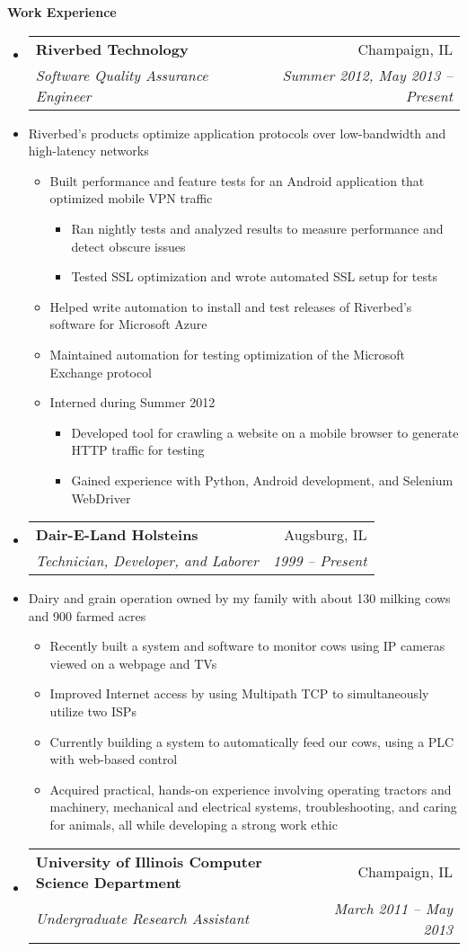 \documentclass[letterpaper,11pt]{article}
\makeatletter
\newcommand{\resitem}[1]{\item #1 \vspace{-2pt}}
\newcommand{\resheading}[1]{{\large \colorbox{mygrey}{\begin{minipage}{\textwidth}{\textbf{#1 \vphantom{p\^{E}}}}\end{minipage}}}}
\newcommand{\ressubheading}[4]{
\begin{tabular*}{7.0in}{l@{\extracolsep{\fill}}r}
		\textbf{#1} & #2 \\
		\textit{#3} & \textit{#4} \\
\end{tabular*}\vspace{-6pt}}
\makeatother
\begin{document}
\resheading{Work Experience}
\begin{itemize}
\item
	\ressubheading{Riverbed Technology}{Champaign, IL}{Software Quality Assurance Engineer}{Summer 2012, May 2013 -- Present}
	\item[]{Riverbed's products optimize application protocols over low-bandwidth and high-latency networks}\vspace{-6pt}
	\begin{itemize}
		\resitem{Built performance and feature tests for an Android application that optimized mobile VPN traffic}
			\begin{itemize}
				\resitem{Ran nightly tests and analyzed results to measure performance and detect obscure issues}
				\resitem{Tested SSL optimization and wrote automated SSL setup for tests}
			\end{itemize}
		\resitem{Helped write automation to install and test releases of Riverbed's software for Microsoft Azure}
		\resitem{Maintained  automation for testing optimization of the Microsoft Exchange protocol}
		\resitem{Interned during Summer 2012}
			\begin{itemize}
				\resitem{Developed tool for crawling a website on a mobile browser to generate HTTP traffic for testing}
				\resitem{Gained experience with Python, Android development, and Selenium WebDriver}
			\end{itemize}
	\end{itemize}
\item
	\ressubheading{Dair-E-Land Holsteins}{Augsburg, IL}{Technician, Developer, and Laborer}{1999 -- Present}
	\item[]{Dairy and grain operation owned by my family with about 130 milking cows and 900 farmed acres}\vspace{-6pt}
	\begin{itemize}
		\resitem{Recently built a system and  software to monitor cows using IP cameras viewed on a webpage and TVs}
		\resitem{Improved Internet access by using Multipath TCP to simultaneously utilize two ISPs}
		\resitem{Currently building a system to automatically feed our cows, using a PLC with web-based control}
		\resitem{Acquired practical, hands-on experience involving operating tractors and machinery, mechanical and electrical systems, troubleshooting, and caring for animals, all while developing a strong work ethic}
	\end{itemize}
\item
	\ressubheading{University of Illinois Computer Science Department}{Champaign, IL}{Undergraduate Research Assistant}{March 2011 -- May 2013}

\end{itemize}
\end{document}
